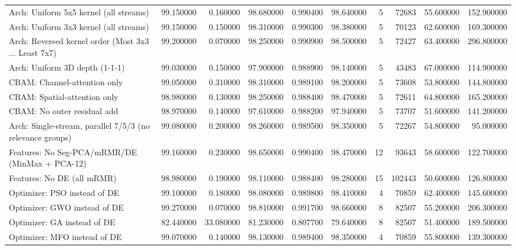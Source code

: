 \begin{tabular}{lrrrrrrrrr}
Arch: Uniform 5x5 kernel (all streams) & 99.150000 & 0.160000 & 98.680000 & 0.990400 & 98.640000 & 5 & 72683 & 55.600000 & 152.900000 \\
Arch: Uniform 3x3 kernel (all streams) & 99.150000 & 0.150000 & 98.310000 & 0.990300 & 98.380000 & 5 & 70123 & 62.600000 & 169.300000 \\
Arch: Reversed kernel order (Most 3x3 ... Least 7x7) & 99.200000 & 0.070000 & 98.250000 & 0.990900 & 98.500000 & 5 & 72427 & 63.400000 & 296.800000 \\
Arch: Uniform 3D depth (1-1-1) & 99.030000 & 0.150000 & 97.900000 & 0.988900 & 98.140000 & 5 & 43483 & 67.000000 & 114.900000 \\
CBAM: Channel-attention only & 99.050000 & 0.310000 & 98.310000 & 0.989100 & 98.200000 & 5 & 73608 & 53.800000 & 144.800000 \\
CBAM: Spatial-attention only & 98.980000 & 0.130000 & 98.250000 & 0.988400 & 98.470000 & 5 & 72611 & 64.800000 & 165.200000 \\
CBAM: No outer residual add & 98.970000 & 0.140000 & 97.610000 & 0.988200 & 97.940000 & 5 & 73707 & 51.600000 & 141.200000 \\
Arch: Single-stream, parallel 7/5/3 (no relevance groups) & 99.080000 & 0.200000 & 98.260000 & 0.989500 & 98.350000 & 5 & 72267 & 54.800000 & 95.000000 \\
Features: No Seg-PCA/mRMR/DE (MinMax + PCA-12)  & 99.160000 & 0.230000 & 98.650000 & 0.990400 & 98.470000 & 12 & 93643 & 58.600000 & 122.700000 \\
Features: No DE (all mRMR) & 98.980000 & 0.190000 & 98.110000 & 0.988400 & 98.280000 & 15 & 102443 & 50.600000 & 126.800000 \\
Optimizer: PSO instead of DE & 99.100000 & 0.180000 & 98.080000 & 0.989800 & 98.410000 & 4 & 70859 & 62.400000 & 145.600000 \\
Optimizer: GWO instead of DE & 99.270000 & 0.070000 & 98.810000 & 0.991700 & 98.660000 & 8 & 82507 & 55.200000 & 206.300000 \\
Optimizer: GA instead of DE & 82.440000 & 33.080000 & 81.230000 & 0.807700 & 79.640000 & 8 & 82507 & 51.400000 & 189.500000 \\
Optimizer: MFO instead of DE & 99.070000 & 0.140000 & 98.130000 & 0.989400 & 98.350000 & 4 & 70859 & 55.800000 & 139.300000 \\
\bottomrule
\end{tabular}
